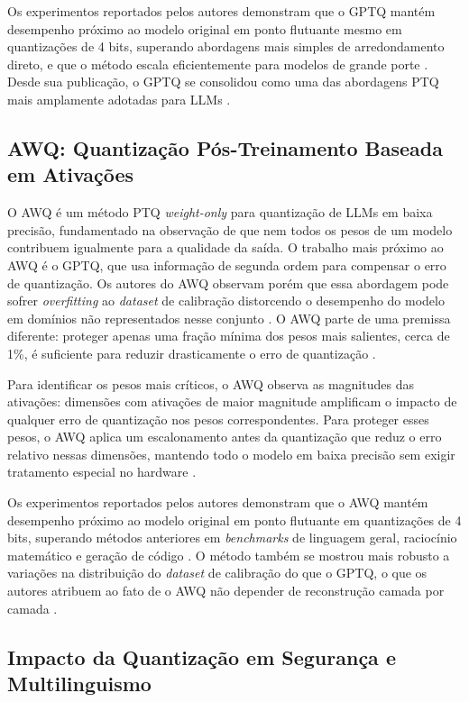 Os experimentos reportados pelos autores demonstram que o GPTQ mantém desempenho próximo ao modelo original em ponto flutuante mesmo em quantizações de 4 bits, superando abordagens mais simples de arredondamento direto, e que o método escala eficientemente para modelos de grande porte \cite{frantar2023gptq}. Desde sua publicação, o GPTQ se consolidou como uma das abordagens PTQ mais amplamente adotadas para LLMs \cite{frantar2023gptq}.

\subsection{AWQ: Quantização Pós-Treinamento Baseada em Ativações}

O AWQ \cite{lin2024awq} é um método PTQ \textit{weight-only} para quantização de LLMs em baixa precisão, fundamentado na observação de que nem todos os pesos de um modelo contribuem igualmente para a qualidade da saída. O trabalho mais próximo ao AWQ é o GPTQ, que usa informação de segunda ordem para compensar o erro de quantização. Os autores do AWQ observam porém que essa abordagem pode sofrer \textit{overfitting} ao \textit{dataset} de calibração distorcendo o desempenho do modelo em domínios não representados nesse conjunto \cite{lin2024awq}. O AWQ parte de uma premissa diferente: proteger apenas uma fração mínima dos pesos mais salientes, cerca de 1\%, é suficiente para reduzir drasticamente o erro de quantização \cite{lin2024awq}.

Para identificar os pesos mais críticos, o AWQ observa as magnitudes das ativações: dimensões com ativações de maior magnitude amplificam o impacto de qualquer erro de quantização nos pesos correspondentes. Para proteger esses pesos, o AWQ aplica um escalonamento antes da quantização que reduz o erro relativo nessas dimensões, mantendo todo o modelo em baixa precisão sem exigir tratamento especial no hardware \cite{lin2024awq}.

Os experimentos reportados pelos autores demonstram que o AWQ mantém desempenho próximo ao modelo original em ponto flutuante em quantizações de 4 bits, superando métodos anteriores em \textit{benchmarks} de linguagem geral, raciocínio matemático e geração de código \cite{lin2024awq}. O método também se mostrou mais robusto a variações na distribuição do \textit{dataset} de calibração do que o GPTQ, o que os autores atribuem ao fato de o AWQ não depender de reconstrução camada por camada \cite{lin2024awq}.

\subsection{Impacto da Quantização em Segurança e Multilinguismo}

